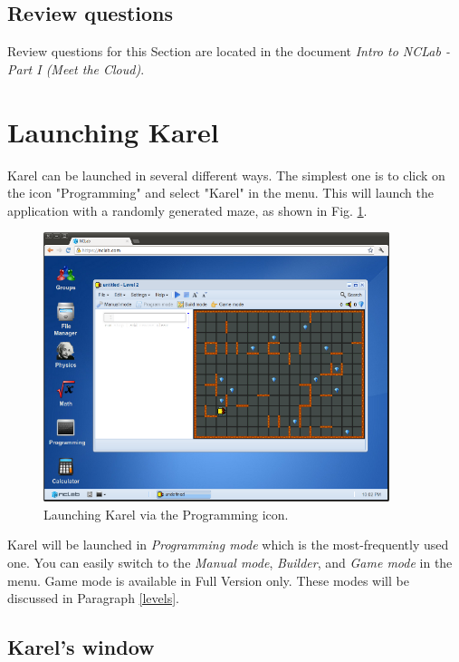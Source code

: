 \documentclass[article,A4,12pt]{llncs}
\begin{document}
\subsection{Review questions}

Review questions for this Section are located in the document {\em Intro to NCLab - Part I 
(Meet the Cloud)}.

\section{Launching Karel}

Karel can be launched in several different ways. The simplest one is to click on the icon 
"Programming" and select "Karel" in the menu. This will launch the application 
with a randomly generated maze, as shown in Fig. \ref{fig:init}.

\newpage

\begin{figure}[!ht]
\begin{center}
\includegraphics[width=0.9\textwidth]{img/init.png}
\end{center}
\caption{Launching Karel via the Programming icon.}
\label{fig:init}
\end{figure}
\noindent
Karel will be launched in {\em Programming mode} which is the most-frequently 
used one. You can easily switch to the {\em Manual mode}, {\em Builder},
and {\em Game mode} in the menu. Game mode is available in Full Version only. 
These modes will be discussed in Paragraph \ref{levels}.

\subsection{Karel's window} \label{menu}
\end{document}
